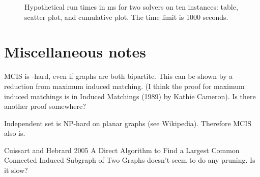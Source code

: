 \begin{figure}[htb]
    \centering
    \caption{Hypothetical run times in ms for two solvers on ten instances: table,
        scatter plot, and cumulative plot. The time limit is 1000 seconds.}
    \label{fig:intro-dummy-figs}
\end{figure}

\section{Miscellaneous notes}

MCIS is \NP-hard, even if graphs are both bipartite.  This can be shown by a
reduction from maximum induced matching.  (I think the proof for maximum induced
matchings is in Induced Matchings (1989) by Kathie Cameron). Is there another
proof somewhere?

Independent set is NP-hard on planar graphs (see Wikipedia).  Therefore
MCIS also is.

Cuissart and Hebrard 2005 A Direct Algorithm to Find a Largest Common
Connected Induced Subgraph of Two Graphs doesn't seem to do any
pruning.  Is it slow?

